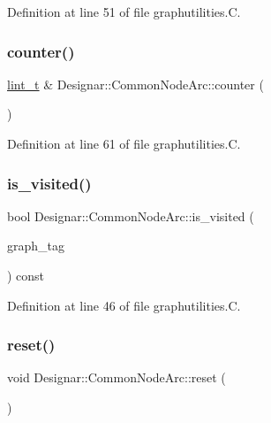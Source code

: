 Definition at line 51 of file graphutilities.\+C.

\mbox{\label{class_designar_1_1_common_node_arc_a8bdada8dfdf47ad02c91cca8c848d287}} 
\subsubsection{\texorpdfstring{counter()}{counter()}}
{\footnotesize\ttfamily \hyperlink{namespace_designar_a9d113d66a39e82b73727c72cd3a52f73}{lint\+\_\+t} \& Designar\+::\+Common\+Node\+Arc\+::counter (\begin{DoxyParamCaption}{ }\end{DoxyParamCaption})}



Definition at line 61 of file graphutilities.\+C.

\mbox{\label{class_designar_1_1_common_node_arc_a1852b6cf543bfb695bad590804ecaacd}} 
\subsubsection{\texorpdfstring{is\+\_\+visited()}{is\_visited()}}
{\footnotesize\ttfamily bool Designar\+::\+Common\+Node\+Arc\+::is\+\_\+visited (\begin{DoxyParamCaption}\item[{\hyperlink{namespace_designar_ac91366256ea6ea6ac5fd483d55a7499e}{Graph\+Tag}}]{graph\+\_\+tag }\end{DoxyParamCaption}) const}



Definition at line 46 of file graphutilities.\+C.

\mbox{\label{class_designar_1_1_common_node_arc_a1dd1385837012b02ee3c67a7e3f5ccc1}} 
\subsubsection{\texorpdfstring{reset()}{reset()}}
{\footnotesize\ttfamily void Designar\+::\+Common\+Node\+Arc\+::reset (\begin{DoxyParamCaption}{ }\end{DoxyParamCaption})}



